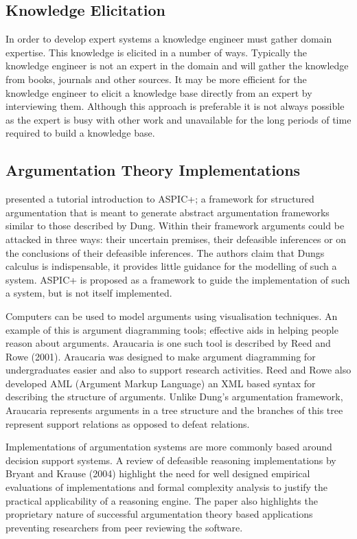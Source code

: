 \subsection{Knowledge Elicitation}

In order to develop expert systems a knowledge engineer must gather domain expertise. This knowledge is elicited in a number of ways. Typically the knowledge engineer is not an expert in the domain and will gather the knowledge from books, journals and other sources. It may be more efficient for the knowledge engineer to elicit a knowledge base directly from an expert by interviewing them. Although this approach is preferable it is not always possible as the expert is busy with other work and unavailable for the long periods of time required to build a knowledge base.



\subsection{Argumentation Theory Implementations}
\label{sec:dr_implementations}

\cite{modgil2014aspic+} presented a tutorial introduction to ASPIC+; a framework for structured argumentation that is meant to generate abstract argumentation frameworks similar to those described by Dung. Within their framework arguments could be attacked in three ways: their uncertain premises, their defeasible inferences or on the conclusions of their defeasible inferences. The authors claim that Dungs calculus is indispensable, it provides little guidance for the modelling of such a system. ASPIC+ is proposed as a framework to guide the implementation of such a system, but is not itself implemented.

Computers can be used to model arguments using visualisation techniques. An example of this is argument diagramming tools; effective aids in helping people reason about arguments. Araucaria is one such tool is described by Reed and Rowe (2001). Araucaria was designed to make argument diagramming for undergraduates easier and also to support research activities. Reed and Rowe also developed AML (Argument Markup Language) an XML based syntax for describing the structure of arguments. Unlike Dung’s argumentation framework, Araucaria represents arguments in a tree structure and the branches of this tree represent support relations as opposed to defeat relations.

Implementations of argumentation systems are more commonly based around decision support systems. A review of defeasible reasoning implementations by Bryant and Krause (2004) highlight the need for well designed empirical evaluations of implementations and formal complexity analysis to justify the practical applicability of a reasoning engine. The paper also highlights the proprietary nature of successful argumentation theory based applications preventing researchers from peer reviewing the software.

